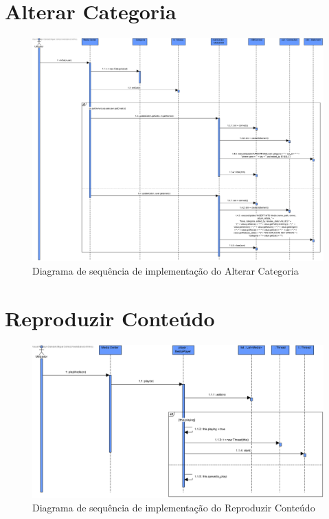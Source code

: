 \documentclass[a4paper]{report}
\begin{document}
\section{Alterar Categoria}
\begin{figure}[H]
	\centering 
    \includegraphics[width=\textwidth]{images/altcategoriaImp.png}  
    \caption{Diagrama de sequência de implementação do Alterar Categoria}
\end{figure}

\section{Reproduzir Conteúdo}
\begin{figure}[H]
	\centering 
    \includegraphics[width=\textwidth]{images/repConteudoImp.png}  
    \caption{Diagrama de sequência de implementação do Reproduzir Conteúdo}
\end{figure}
\end{document}
